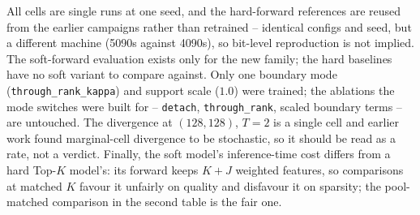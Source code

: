 \documentclass[11pt,a4paper]{article}
\newcommand{\code}[1]{\texttt{#1}}
\begin{document}
All cells are single runs at one seed, and the hard-forward references are
reused from the earlier campaigns rather than retrained -- identical configs
and seed, but a different machine (5090s against 4090s), so bit-level
reproduction is not implied. The soft-forward evaluation exists only for the
new family; the hard baselines have no soft variant to compare against. Only
one boundary mode (\code{through\_rank\_kappa}) and support scale ($1.0$) were
trained; the ablations the mode switches were built for -- \code{detach},
\code{through\_rank}, scaled boundary terms -- are untouched. The divergence
at $(128,128)$, $T=2$ is a single cell and earlier work found marginal-cell
divergence to be stochastic, so it should be read as a rate, not a verdict.
Finally, the soft model's inference-time cost differs from a hard Top-$K$
model's: its forward keeps $K{+}J$ weighted features, so comparisons at
matched $K$ favour it unfairly on quality and disfavour it on sparsity; the
pool-matched comparison in the second table is the fair one.
\end{document}
